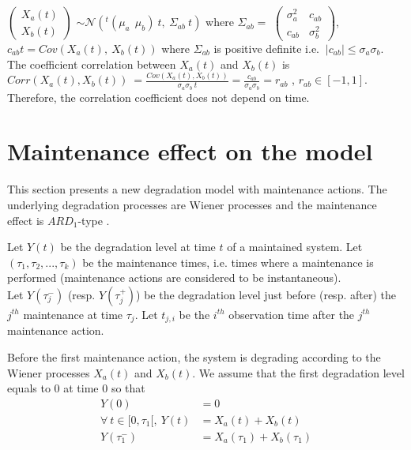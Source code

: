 $\begin{pmatrix}
X_a(t)\\
X_b(t)
\end{pmatrix}$
$\sim \mathcal{N}\left( ^t(\mu_a \ \ \mu_b )\ t,\   \Sigma_{ab} \ t \right)$ where $ \Sigma_{ab}=$
$\begin{pmatrix}
\sigma_a^2 \  &  c_{ab}  \\
 c_{ab}  & \sigma_b^2
\end{pmatrix}$, $ c_{ab} t= Cov \left(X_a(t),\ 
X_b(t)\right)$
where $ \Sigma_{ab} $ is  positive definite i.e. $\ |c_{ab}| \leq \sigma_a \sigma_b$.\\

\noindent The coefficient correlation between $X_{a}(t)$ and $X_{b}(t)$ is $Corr(X_{a}(t),X_{b}(t)) \ =\frac{Cov(X_{a}(t),X_{b}(t))}{\sigma_a \sigma_b\ t}=\frac{c_{ab}}{\sigma_a\sigma_b}=r_{ab}$ , $ r_{ab}\in [-1,1]$. Therefore, the correlation coefficient does not depend on time. 

\label{section:intro}

\section{Maintenance effect on the model}

This section presents a new degradation model with maintenance actions. The underlying degradation processes are Wiener processes and the maintenance effect is $ARD_1$-type \cite{mercier_stochastic_2019}. 


\noindent Let $Y(t)$ be the degradation level at time $t$ of a maintained system. Let $(\tau_1,\tau_2,...,\tau_k)$ be the maintenance times, i.e. times where a maintenance is performed (maintenance actions are considered to be instantaneous). \\


\noindent Let $Y(\tau_j^-)$ (resp. $Y(\tau_j^+)$) be the degradation level just before (resp. after) the $j^{th}$ maintenance at time $\tau_j$. Let $t_{j,i}$ be the $i^{th}$ observation time after the $j^{th}$ maintenance action.  

\noindent Before the first maintenance action, the system is degrading according to the Wiener processes $X_a(t)$ and $X_b(t)$. We assume that the first degradation level equals to 0 at time 0 so that
\begin{align*}
Y(0)&=0\\
\forall\ t \in [0,\tau_1[,\ Y(t)&=X_a(t)+X_b(t)\\
Y(\tau_1^-)&=X_a(\tau_1)+X_b(\tau_1)
\end{align*}

